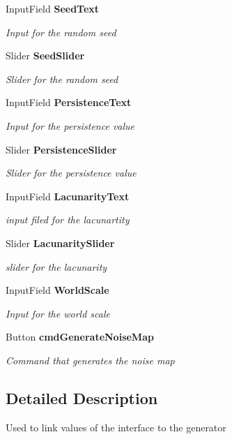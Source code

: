 \begin{DoxyCompactItemize}
Input\+Field \textbf{ Seed\+Text}
\begin{DoxyCompactList}\small\item\em Input for the random seed \end{DoxyCompactList}\item 
Slider \textbf{ Seed\+Slider}
\begin{DoxyCompactList}\small\item\em Slider for the random seed \end{DoxyCompactList}\item 
Input\+Field \textbf{ Persistence\+Text}
\begin{DoxyCompactList}\small\item\em Input for the persistence value \end{DoxyCompactList}\item 
Slider \textbf{ Persistence\+Slider}
\begin{DoxyCompactList}\small\item\em Slider for the persistence value \end{DoxyCompactList}\item 
Input\+Field \textbf{ Lacunarity\+Text}
\begin{DoxyCompactList}\small\item\em input filed for the lacunartity \end{DoxyCompactList}\item 
Slider \textbf{ Lacunarity\+Slider}
\begin{DoxyCompactList}\small\item\em slider for the lacunarity \end{DoxyCompactList}\item 
Input\+Field \textbf{ World\+Scale}
\begin{DoxyCompactList}\small\item\em Input for the world scale \end{DoxyCompactList}\item 
Button \textbf{ cmd\+Generate\+Noise\+Map}
\begin{DoxyCompactList}\small\item\em Command that generates the noise map \end{DoxyCompactList}\end{DoxyCompactItemize}


\subsection{Detailed Description}
Used to link values of the interface to the generator 



